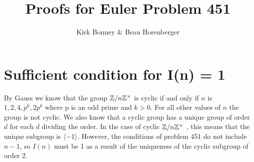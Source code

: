\documentclass{article}
\title{Proofs for Euler Problem 451}
\author{Kirk Bonney & Beau Horenberger}
\date{}
\begin{document}
\maketitle

\section{Sufficient condition for I(n) = 1}

By Gauss we know that the group $\mathbb Z / n \mathbb Z^\times$ is cyclic if and only if $n$ is $1,2,4,p^k,2p^k$ where p is an odd prime and $k>0$. For all other values of $n$ the group is not cyclic. We also know that a cyclic group has a unique group of order $d$ for each $d$ dividing the order. In the case of cyclic $\mathbb Z / n \mathbb Z^\times$ , this means that the unique subgroup is $\langle -1 \rangle$. However, the conditions of problem 451 do not include $n-1$, so $I(n)$ must be 1 as a result of the uniqueness of the cyclic subgroup of order 2.
\end{document}

